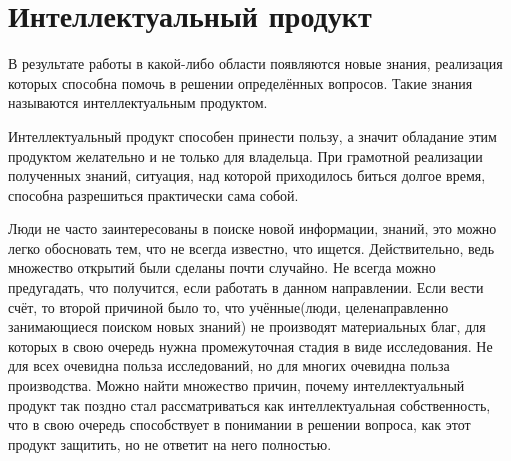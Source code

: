 \section{Интеллектуальный продукт}
В результате работы в какой-либо области появляются новые знания,
	реализация которых способна помочь в решении определённых вопросов.
Такие знания называются интеллектуальным продуктом.
\cite{bibliotekar}

Интеллектуальный продукт способен принести пользу,
	а значит обладание этим продуктом желательно и не только для владельца.
При грамотной реализации полученных знаний,
	ситуация,
		над которой приходилось биться долгое время,
	способна разрешиться практически сама собой.

Люди не часто заинтересованы в поиске новой информации, знаний,
	это можно легко обосновать тем,
		что не всегда известно,
			что ищется.
Действительно, ведь множество открытий были сделаны почти случайно.
Не всегда можно предугадать,
	что получится,
		если работать в данном направлении.
Если вести счёт, то второй причиной было то,
	что учённые(люди, целенаправленно занимающиеся поиском новых знаний) не производят материальных благ,
		для которых в свою очередь нужна промежуточная стадия в виде исследования.
Не для всех очевидна польза исследований,
	но для многих очевидна польза производства.
Можно найти множество причин,
	почему интеллектуальный продукт так поздно стал рассматриваться как интеллектуальная собственность,
	что в свою очередь способствует в понимании в решении вопроса,
		как этот продукт защитить,
	но не ответит на него полностью.
